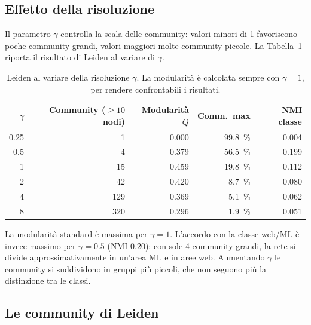 \documentclass[11pt]{report}
\begin{document}
\subsection{Effetto della risoluzione}
Il parametro $\gamma$ controlla la scala delle community: valori minori di 1
favoriscono poche community grandi, valori maggiori molte community piccole. La
Tabella~\ref{tab:st_gamma} riporta il risultato di Leiden al variare di $\gamma$.

\begin{table}[H]
  \centering
  \caption{Leiden al variare della risoluzione $\gamma$. La modularità è calcolata
  sempre con $\gamma=1$, per rendere confrontabili i risultati.}
  \label{tab:st_gamma}
  \small
  \begin{tabular}{@{}rrrrr@{}}
    \toprule
    $\gamma$ & \textbf{Community ($\geq 10$ nodi)} & \textbf{Modularità $Q$} & \textbf{Comm.\ max} & \textbf{NMI classe} \\
    \midrule
    \num{0.25} & 1   & \num{0.000} & \SI{99.8}{\percent} & \num{0.004} \\
    \num{0.5}  & 4   & \num{0.379} & \SI{56.5}{\percent} & \num{0.199} \\
    1          & 15  & \num{0.459} & \SI{19.8}{\percent} & \num{0.112} \\
    2          & 42  & \num{0.420} & \SI{8.7}{\percent}  & \num{0.080} \\
    4          & 129 & \num{0.369} & \SI{5.1}{\percent}  & \num{0.062} \\
    8          & 320 & \num{0.296} & \SI{1.9}{\percent}  & \num{0.051} \\
    \bottomrule
  \end{tabular}
\end{table}

La modularità standard è massima per $\gamma=1$. L'accordo con la classe web/ML è
invece massimo per $\gamma=\num{0.5}$ (NMI \num{0.20}): con sole 4 community
grandi, la rete si divide approssimativamente in un'area ML e in aree web. Aumentando
$\gamma$ le community si suddividono in gruppi più piccoli, che non seguono più la
distinzione tra le classi.

\subsection{Le community di Leiden}
\end{document}
